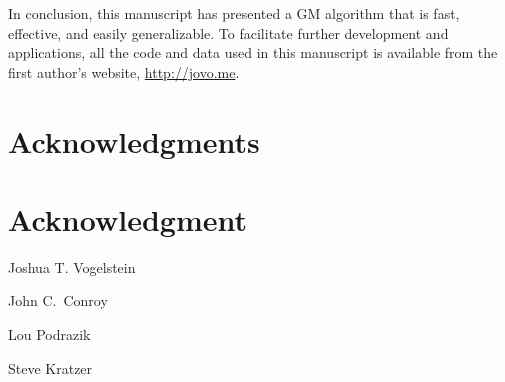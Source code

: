 \documentclass[10pt,journal,cspaper,compsoc]{IEEEtran}
\begin{document}
In conclusion, this manuscript has presented a GM algorithm that is fast, effective, and easily generalizable.  To facilitate further development and applications, all the code and data used in this manuscript is available from the first author's website, \url{http://jovo.me}.












\ifCLASSOPTIONcompsoc
  \section*{Acknowledgments}
\else
  \section*{Acknowledgment}
\fi


\ifCLASSOPTIONcaptionsoff
  \newpage
\fi




\begin{IEEEbiographynophoto}{Joshua T. Vogelstein}

\end{IEEEbiographynophoto}



\begin{IEEEbiographynophoto}{John C.~Conroy}

\end{IEEEbiographynophoto}

\begin{IEEEbiographynophoto}{Lou Podrazik}

\end{IEEEbiographynophoto}

\begin{IEEEbiographynophoto}{Steve Kratzer}

\end{IEEEbiographynophoto}
\end{document}
